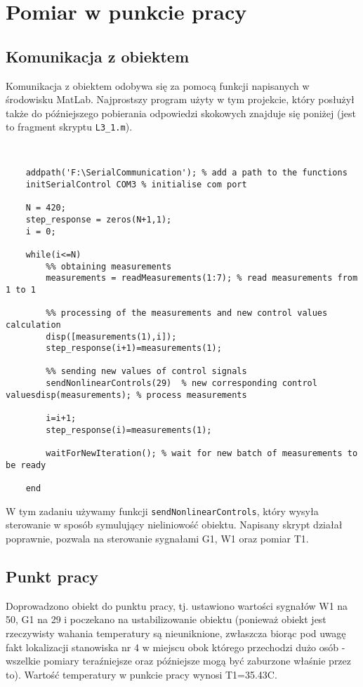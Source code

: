 \chapter {Pomiar w punkcie pracy}
\label{zad1l}

\section{Komunikacja z obiektem}

Komunikacja z obiektem odobywa się za pomocą funkcji napisanych w środowisku MatLab. Najprostszy program użyty w tym projekcie, który posłużył także do późniejszego pobierania odpowiedzi skokowych znajduje się poniżej (jest to fragment skryptu \verb|L3_1.m|).


\begin{lstlisting}[style=custommatlab]


    addpath('F:\SerialCommunication'); % add a path to the functions
    initSerialControl COM3 % initialise com port
   
    N = 420;
    step_response = zeros(N+1,1);
    i = 0;
    
    while(i<=N)
        %% obtaining measurements
        measurements = readMeasurements(1:7); % read measurements from 1 to 1
        
        %% processing of the measurements and new control values calculation
        disp([measurements(1),i]);
        step_response(i+1)=measurements(1);
        
        %% sending new values of control signals
        sendNonlinearControls(29)  % new corresponding control valuesdisp(measurements); % process measurements
      
        i=i+1;
        step_response(i)=measurements(1);
        
        waitForNewIteration(); % wait for new batch of measurements to be ready
        
    end

\end{lstlisting} 

W tym zadaniu używamy funkcji \verb|sendNonlinearControls|, który wysyła sterowanie w sposób symulujący nieliniowość obiektu. Napisany skrypt działał poprawnie, pozwala na sterowanie sygnałami G1, W1 oraz pomiar T1.

\section{Punkt pracy}

Doprowadzono obiekt do punktu pracy, tj. ustawiono wartości sygnałów W1 na 50, G1 na 29 i poczekano na ustabilizowanie obiektu (ponieważ obiekt jest rzeczywisty wahania temperatury są nieuniknione, zwłaszcza biorąc pod uwagę fakt lokalizacji stanowiska nr 4 w miejscu obok którego przechodzi dużo osób - wszelkie pomiary teraźniejsze oraz późniejsze mogą być zaburzone właśnie przez to). Wartość temperatury w punkcie pracy wynosi T1=\num{35,43}\degree C.
